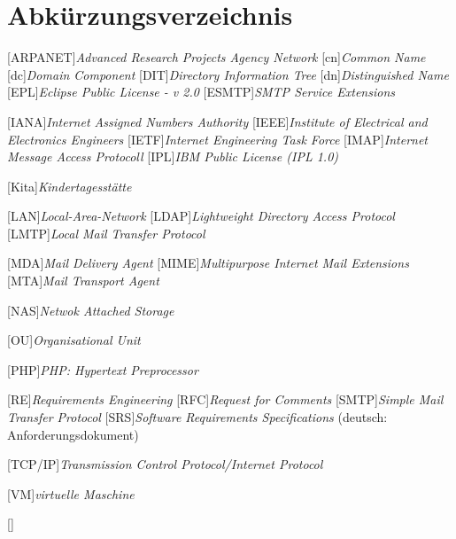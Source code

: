 
\chapter*{Abkürzungsverzeichnis}
\markboth{}{}

\begin{acronym}[]
[ARPANET]{\textit{Advanced Research Projects Agency Network}}
[cn]{\textit{Common Name}}
[dc]{\textit{Domain Component}}
[DIT]{\textit{Directory Information Tree}}
[dn]{\textit{Distinguished Name}}
[EPL]{\textit{Eclipse Public License - v 2.0}}
[ESMTP]{\textit{SMTP Service Extensions}}



[IANA]{\textit{Internet Assigned Numbers Authority}}
[IEEE]{\textit{Institute of Electrical and Electronics Engineers}}
[IETF]{\textit{Internet Engineering Task Force}}
[IMAP]{\textit{Internet Message Access Protocoll}}
[IPL]{\textit{IBM Public License (IPL 1.0)}}


[Kita]{\textit{Kindertagesstätte}}

[LAN]{\textit{Local-Area-Network}}
[LDAP]{\textit{Lightweight Directory Access Protocol}}
[LMTP]{\textit{Local Mail Transfer Protocol}}

[MDA]{\textit{Mail Delivery Agent}}
[MIME]{\textit{Multipurpose Internet Mail Extensions}}
[MTA]{\textit{Mail Transport Agent}}

[NAS]{\textit{Netwok Attached Storage}}

[OU]{\textit{Organisational Unit}}

[PHP]{\textit{PHP: Hypertext Preprocessor}}


[RE]{\textit{Requirements Engineering}}
[RFC]{\textit{Request for Comments}}
[SMTP]{\textit{Simple Mail Transfer Protocol}}
[SRS]{\textit{Software Requirements Specifications}} (deutsch: Anforderungsdokument)

[TCP/IP]{\textit{Transmission Control Protocol/Internet Protocol}}

[VM]{\textit{virtuelle Maschine}}








\end{acronym}[]
